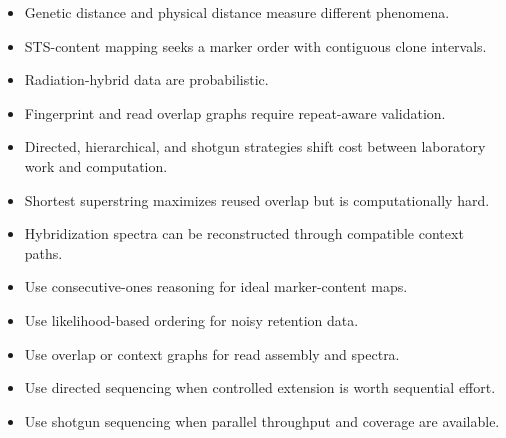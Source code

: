 \documentclass[11pt]{article}
\begin{document}
\begin{tcolorbox}[enhanced,breakable,title={Key takeaways},
  colback=white,colframe=Primary,fonttitle=\small\sffamily\bfseries,fontupper=\footnotesize,
  boxsep=0.6mm,left=1.5mm,right=1.5mm,top=1mm,bottom=1mm,before skip=3pt,after skip=3pt]
\begin{itemize}
  \item Genetic distance and physical distance measure different phenomena.
  \item STS-content mapping seeks a marker order with contiguous clone intervals.
  \item Radiation-hybrid data are probabilistic.
  \item Fingerprint and read overlap graphs require repeat-aware validation.
  \item Directed, hierarchical, and shotgun strategies shift cost between laboratory work and computation.
  \item Shortest superstring maximizes reused overlap but is computationally hard.
  \item Hybridization spectra can be reconstructed through compatible context paths.
\end{itemize}
\end{tcolorbox}

\begin{tcolorbox}[enhanced,breakable,title={Algorithm selection / when to use this},
  colback=Primary!3,colframe=Primary,fonttitle=\small\sffamily\bfseries,fontupper=\footnotesize,
  boxsep=0.6mm,left=1.5mm,right=1.5mm,top=1mm,bottom=1mm,before skip=3pt,after skip=3pt]
\begin{itemize}
  \item Use consecutive-ones reasoning for ideal marker-content maps.
  \item Use likelihood-based ordering for noisy retention data.
  \item Use overlap or context graphs for read assembly and spectra.
  \item Use directed sequencing when controlled extension is worth sequential effort.
  \item Use shotgun sequencing when parallel throughput and coverage are available.
\end{itemize}
\end{tcolorbox}
\end{document}
